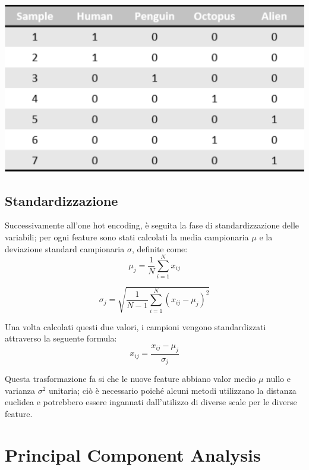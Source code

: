\documentclass[a4paper,8pt]{article}
\newenvironment{Figure}
  {\par\medskip\noindent\minipage{\linewidth}}
  {\endminipage\par\medskip}
\begin{document}
\begin{multicols}{2}
\begin{Figure}
 \centering
 \includegraphics[width=\linewidth]{categvecbw}
\end{Figure}

\subsection{Standardizzazione}
Successivamente all'one hot encoding, è seguita la fase di standardizzazione delle variabili; per ogni feature sono stati calcolati la media campionaria $\mu$ e la deviazione standard campionaria $\sigma$, definite come: 
\begin{equation}
	\mu_{j} = \frac{1}{N}\sum_{i=1}^{N} x_{ij}
\end{equation}
 
\begin{equation}
	\sigma_{j} = \sqrt{\frac{1}{N-1}\sum_{i=1}^{N}(x_{ij} - \mu_{j})^2}
\end{equation} 

Una volta calcolati questi due valori, i campioni vengono standardizzati attraverso la seguente formula:
\begin{equation}
	x_{ij} = \frac{x_{ij} - \mu_{j}}{\sigma_{j}}
\end{equation}

Questa trasformazione fa si che le nuove feature abbiano valor medio $\mu$ nullo e varianza $\sigma^2$ unitaria;  ciò è necessario poiché alcuni metodi utilizzano la distanza euclidea e potrebbero essere ingannati dall'utilizzo di diverse scale per le diverse feature. %

\section{Principal Component Analysis}


\end{multicols}
\end{document}
